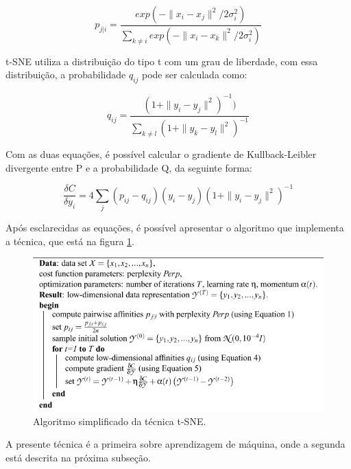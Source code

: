 \begin{equation}\label{eq:t-sne_1}
    p_{j|i}=\frac{exp(-\parallel x_i-x_j\parallel^2/2\sigma_i^2)}{\sum_{k\ne i}{exp(-\parallel x_i-x_k\parallel^2/2\sigma_i^2)}}
\end{equation}

t-SNE utiliza a distribuição do tipo t com um grau de liberdade, com essa distribuição, a probabilidade $q_{ij}$ pode ser calculada como:

\begin{equation}\label{eq:t-sne_4}
    q_{ij}=\frac{(1+\parallel y_i-y_j\parallel^2)^{-1})}{\sum_{k\ne l}{(1 + \parallel y_k-y_l\parallel^2)^{-1}}}
\end{equation}

Com as duas equações, é possível calcular o gradiente de Kullback-Leibler  divergente entre P e a probabilidade Q, da seguinte forma:

\begin{equation}\label{eq:t-sne_5}
    \frac{\delta C}{\delta y_i} = 4 \sum_j{(p_{ij}-q_{ij})(y_i - y_j)(1+\parallel y_i-y_j\parallel^2)^{-1}}
\end{equation}

Após esclarecidas as equações, é possível apresentar o algoritmo que implementa a técnica, que está na figura \ref{fig:t-sne_algorithm_maaten_p9}.
\begin{figure}[H]
    \caption{Algoritmo simplificado da técnica t-SNE.}
    \begin{center}
        \includegraphics[scale=.45]{referencial/img/t-sne_algorithm_maaten_p9.png}
    \end{center}
    \label{fig:t-sne_algorithm_maaten_p9}
\end{figure}

A presente técnica é a primeira sobre aprendizagem de máquina, onde a segunda está descrita na próxima subseção.


